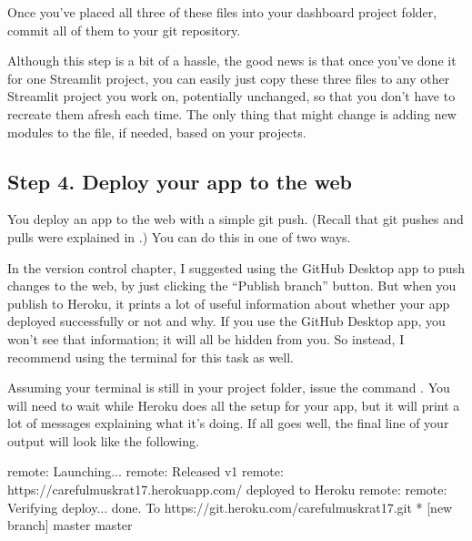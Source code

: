 \documentclass[letterpaper,10pt,english]{sphinxmanual}
\begin{document}
Once you’ve placed all three of these files into your dashboard project folder, commit all of them to your git repository.

Although this step is a bit of a hassle, the good news is that once you’ve done it for one Streamlit project, you can easily just copy these three files to any other Streamlit project you work on, potentially unchanged, so that you don’t have to recreate them afresh each time.  The only thing that might change is adding new modules to the  file, if needed, based on your projects.


\subsection{Step 4. Deploy your app to the web}
\label{\detokenize{chapter-14-dashboards:step-4-deploy-your-app-to-the-web}}
You deploy an app to the web with a simple git push.  (Recall that git pushes and pulls were explained in .)  You can do this in one of two ways.

In the version control chapter, I suggested using the GitHub Desktop app to push changes to the web, by just clicking the “Publish branch” button.  But when you publish to Heroku, it prints a lot of useful information about whether your app deployed successfully or not and why.  If you use the GitHub Desktop app, you won’t see that information; it will all be hidden from you.  So instead, I recommend using the terminal for this task as well.

Assuming your terminal is still in your project folder, issue the command .  You will need to wait while Heroku does all the setup for your app, but it will print a lot of messages explaining what it’s doing.  If all goes well, the final line of your output will look like the following.

\begin{sphinxVerbatim}[commandchars=\\\{\}]
remote: \PYGZhy{}\PYGZhy{}\PYGZhy{}\PYGZhy{}\PYGZhy{}\PYGZgt{} Launching...
remote:        Released v1
remote:        https://careful\PYGZhy{}muskrat\PYGZhy{}17.herokuapp.com/ deployed to Heroku
remote:
remote: Verifying deploy... done.
To https://git.heroku.com/careful\PYGZhy{}muskrat\PYGZhy{}17.git
 * [new branch]      master \PYGZhy{}\PYGZgt{} master
\end{sphinxVerbatim}
\end{document}
